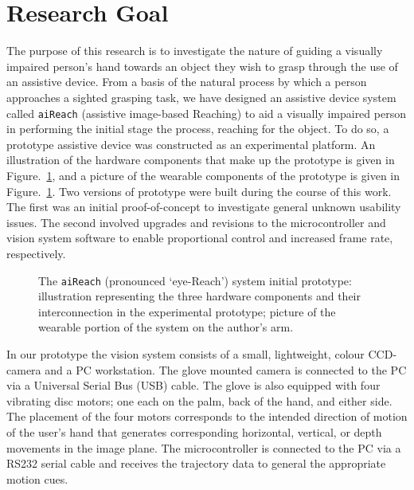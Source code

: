 \section{Research Goal}\label{ch:Introduction:sec:ResearchGoal}
The purpose of this research is to investigate the nature of guiding a visually impaired person's hand towards an object they wish to grasp through the use of an assistive device.  From a basis of the natural process by which a person approaches a sighted grasping task, we have designed an assistive device system called \texttt{aiReach} (assistive image-based Reaching) to aid a visually impaired person in performing the initial stage the process, reaching for the object.  To do so, a prototype assistive device was constructed as an experimental platform.  An illustration of the hardware components that make up the prototype is given in Figure.~\ref{fig:proto:aiReach}, and a picture of the wearable components of the prototype is given in Figure.~\ref{fig:proto:aiReach}.
Two versions of prototype were built during the course of this work.  The first was an initial proof-of-concept to investigate general unknown usability issues.  The second involved upgrades and revisions to the microcontroller and vision system software to enable proportional control and increased frame rate, respectively.
\begin{figure}[ht]
\centering
        \caption[\texttt{aiReach} prototype assistive device]{The \texttt{aiReach} (pronounced `eye-Reach') system initial prototype:  illustration representing the three hardware components and their interconnection in the experimental prototype;  picture of the wearable portion of the system on the author's arm.}
    \label{fig:proto:aiReach}
\end{figure}
In our prototype the vision system consists of a small, lightweight, colour CCD-camera and a PC workstation.  The glove mounted camera is connected to the PC via a Universal Serial Bus (USB) cable. The glove is also equipped with four vibrating disc motors; one each on the palm, back of the hand, and either side. The placement of the four motors
corresponds to the intended direction of motion of the user's hand
that generates corresponding horizontal, vertical, or depth movements in the image plane.
The microcontroller is connected to the PC via a RS232 serial cable and receives the trajectory data to general the appropriate motion cues.

